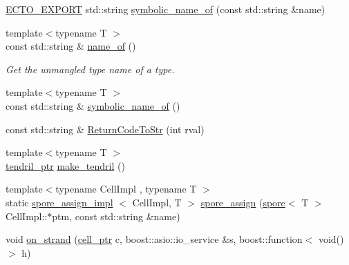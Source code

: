 \begin{DoxyCompactItemize}
\hyperlink{util_8hpp_ab55b7868679cda60fc162580957fb98c}{\-E\-C\-T\-O\-\_\-\-E\-X\-P\-O\-R\-T} std\-::string \hyperlink{namespaceecto_a56b14793c548143a90d5bff5a7c279b8}{symbolic\-\_\-name\-\_\-of} (const std\-::string \&name)
\item 
{\footnotesize template$<$typename T $>$ }\\const std\-::string \& \hyperlink{namespaceecto_a2420930e76b8e95a3f241c4dc154f8f8}{name\-\_\-of} ()
\begin{DoxyCompactList}\small\item\em \-Get the unmangled type name of a type. \end{DoxyCompactList}\item 
{\footnotesize template$<$typename T $>$ }\\const std\-::string \& \hyperlink{namespaceecto_a1df1f18305fe27e87f2a845d02f31db9}{symbolic\-\_\-name\-\_\-of} ()
\item 
const std\-::string \& \hyperlink{namespaceecto_a00786d16020c07e60fea08e8352dba30}{\-Return\-Code\-To\-Str} (int rval)
\item 
{\footnotesize template$<$typename T $>$ }\\\hyperlink{namespaceecto_a84fb5f6130275382e5cbeb5fdececa78}{tendril\-\_\-ptr} \hyperlink{namespaceecto_af284ea4dc605a1d2e037731e5f35eeaa}{make\-\_\-tendril} ()
\item 
{\footnotesize template$<$typename Cell\-Impl , typename T $>$ }\\static \hyperlink{structecto_1_1spore__assign__impl}{spore\-\_\-assign\-\_\-impl}\*
$<$ \-Cell\-Impl, \-T $>$ \hyperlink{namespaceecto_a776138cb830340922312c3ec98c15b6d}{spore\-\_\-assign} (\hyperlink{structecto_1_1spore}{spore}$<$ \-T $>$ \-Cell\-Impl\-::$\ast$ptm, const std\-::string \&name)
\item 
void \hyperlink{namespaceecto_a653dab75b6cd892233b9f3676a5d2921}{on\-\_\-strand} (\hyperlink{namespaceecto_aed1809e82b9229ea81ef9ee3438cf62c}{cell\-\_\-ptr} c, boost\-::asio\-::io\-\_\-service \&s, boost\-::function$<$ void()$>$ h)
\end{DoxyCompactItemize}


